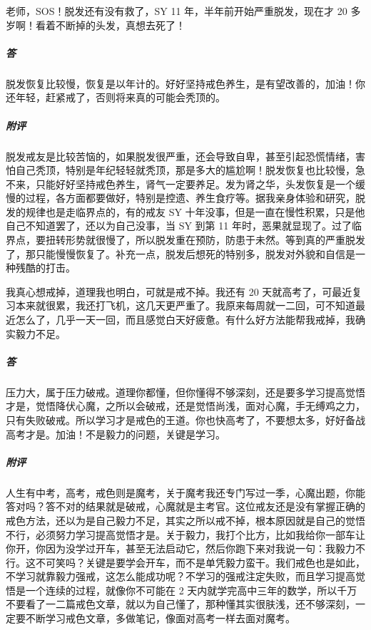 \begin{case}
    老师，SOS！脱发还有没有救了，SY 11 年，半年前开始严重脱发，现在才 20 多岁啊！看着不断掉的头发，真想去死了！
    \subparagraph{答} 脱发恢复比较慢，恢复是以年计的。好好坚持戒色养生，是有望改善的，加油！你还年轻，赶紧戒了，否则将来真的可能会秃顶的。
    \subparagraph{附评} 脱发戒友是比较苦恼的，如果脱发很严重，还会导致自卑，甚至引起恐慌情绪，害怕自己秃顶，特别是年纪轻轻就秃顶，那是多大的尴尬啊！脱发恢复也比较慢，急不来，只能好好坚持戒色养生，肾气一定要养足。发为肾之华，头发恢复是一个缓慢的过程，各方面都要做好，特别是控遗、养生食疗等。据我亲身体验和研究，脱发的规律也是走临界点的，有的戒友 SY 十年没事，但是一直在慢性积累，只是他自己不知道罢了，还以为自己没事，当 SY 到第 11 年时，恶果就显现了。过了临界点，要扭转形势就很慢了，所以脱发重在预防，防患于未然。等到真的严重脱发了，那只能慢慢恢复了。补充一点，脱发后想死的特别多，脱发对外貌和自信是一种残酷的打击。
\end{case}

\begin{case}
    我真心想戒掉，道理我也明白，可就是戒不掉。我还有 20 天就高考了，可最近复习本来就很累，我还打飞机，这几天更严重了。我原来每周就一二回，可不知道最近怎么了，几乎一天一回，而且感觉白天好疲惫。有什么好方法能帮我戒掉，我确实毅力不足。
    \subparagraph{答} 压力大，属于压力破戒。道理你都懂，但你懂得不够深刻，还是要多学习提高觉悟才是，觉悟降伏心魔，之所以会破戒，还是觉悟尚浅，面对心魔，手无缚鸡之力，只有失败破戒。所以学习才是戒色的王道。你也快高考了，不要想太多，好好备战高考才是。加油！不是毅力的问题，关键是学习。
    \subparagraph{附评} 人生有中考，高考，戒色则是魔考，关于魔考我还专门写过一季，心魔出题，你能答对吗？答不对的结果就是破戒，心魔就是主考官。这位戒友还是没有掌握正确的戒色方法，还以为是自己毅力不足，其实之所以戒不掉，根本原因就是自己的觉悟不行，必须努力学习提高觉悟才是。关于毅力，我打个比方，比如我给你一部车让你开，你因为没学过开车，甚至无法启动它，然后你跑下来对我说一句：我毅力不行。这不可笑吗？关键是要学会开车，而不是单凭毅力蛮干。我们戒色也是如此，不学习就靠毅力强戒，这怎么能成功呢？不学习的强戒注定失败，而且学习提高觉悟是一个连续的过程，就像你不可能在 2 天内就学完高中三年的数学，所以千万不要看了一二篇戒色文章，就以为自己懂了，那种懂其实很肤浅，还不够深刻，一定要不断学习戒色文章，多做笔记，像面对高考一样去面对魔考。
\end{case}

